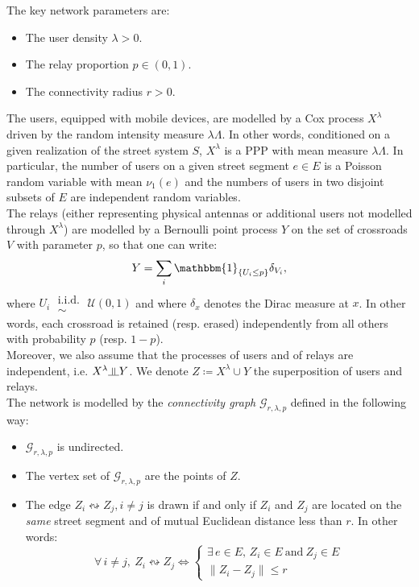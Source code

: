 \documentclass[10pt,a4paper]{amsart}
\theoremstyle{exampstyle}
\theoremstyle{exampnotations}
\newcommand{\indep}{\rotatebox[origin=c]{90}{$\models$}}
\begin{document}
The key network parameters are:
\begin{itemize}
\item The user density $\lambda > 0$.
\item The relay proportion $p \in \left(0,1\right)$.
\item The connectivity radius $r > 0$. \\
\end{itemize}

The users, equipped with mobile devices, are modelled by a Cox process $X^{\lambda}$ driven by the random intensity measure $\lambda \Lambda$. In other words, conditioned on a given realization of the street system $S$, $X^{\lambda}$ is a PPP with mean measure $\lambda \Lambda$. In particular, the number of users on a given street segment $e \in E$ is a Poisson random variable with mean $\nu_{1}(e)$ and the numbers of users in two disjoint subsets of $E$ are independent random variables. \\
\indent The relays (either representing physical antennas or additional users not modelled through $X^{\lambda}$) are modelled by a Bernoulli point process $Y$ on the set of crossroads $V$ with parameter $p$, so that one can write:
\begin{equation*}
Y = \sum_{i} \mathbbm{1}_{\lbrace U_{i} \leq p \rbrace } \delta_{V_{i}},
\end{equation*}
where $U_{i} \;\substack{ \text{i.i.d.} \\ \sim} \; \mathcal{U}(0,1)$ and where $\delta_{x}$ denotes the Dirac measure at $x$. In other words, each crossroad is retained (resp. erased) independently from all others with probability $p$ (resp. $1-p$). \\
\noindent Moreover, we also assume that the processes of users and of relays are independent, i.e. $X^{\lambda} \indep Y$. We denote $Z \coloneqq X^{\lambda} \cup Y$ the superposition of users and relays. \\

The network is modelled by the \emph{connectivity graph} $\mathcal{G}_{r,\lambda,p}$ defined in the following way:
\begin{itemize}
\item $\mathcal{G}_{r,\lambda,p}$ is undirected.
\item The vertex set of $\mathcal{G}_{r,\lambda,p}$ are the points of $Z$.
\item The edge $Z_{i} \leftrightsquigarrow Z_{j}, i \neq j$ is drawn if and only if $Z_{i}$ and $Z_{j}$ are located on the \emph{same} street segment and of mutual Euclidean distance less than $r$. In other words:
\begin{equation}
\label{connectivity_mechanism}
\forall \, i \neq j, \: Z_{i} \leftrightsquigarrow Z_{j} \Leftrightarrow 
\left\{
\begin{array}{l}
\exists \, e \in E, \, Z_{i} \in E  \  \text{and} \  Z_{j} \in E \\
\lVert Z_{i} - Z_{j} \rVert \leq r
\end{array}
\right.
\end{equation}
\end{itemize}
\end{document}
